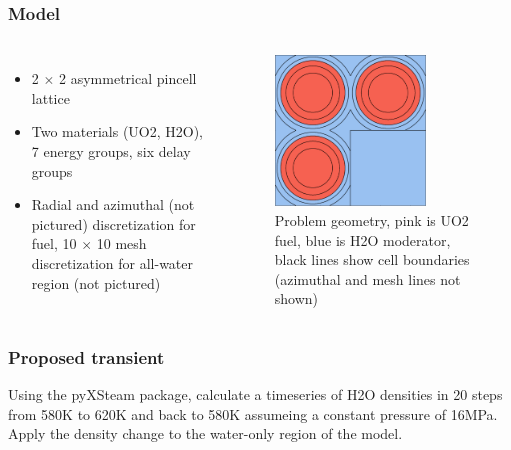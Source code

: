 \begin{frame}
  \frametitle{Model}
    \begin{columns}
        \column[t]{5cm}
            \begin{itemize}
                \item 2 $\times$ 2 asymmetrical pincell lattice
                \item Two materials (UO2, H2O), 7 energy groups, six delay
                    groups
                \item Radial and azimuthal (not pictured) discretization for
                    fuel, 10 $\times$ 10 mesh discretization for all-water region
                    (not pictured)
            \end{itemize}
        \column[t]{5cm}
            \begin{figure}[htbp!]
                \begin{center}
                    \includegraphics[height=4cm]{./figs/geometry-cells.png}
                \end{center}
                \caption{Problem geometry, pink is UO2 fuel, blue is H2O
                moderator, black lines show cell boundaries (azimuthal and mesh
                lines not shown)}
                \label{fig:geometry}
            \end{figure}
        \end{columns}
\end{frame}

\begin{frame}
  \frametitle{Proposed transient}

  Using the pyXSteam package, calculate a timeseries of H2O densities in
  20 steps from 
  580K to 620K and back to 580K assumeing a constant pressure of 16MPa.
  Apply the density change to the water-only region of the model.
\end{frame}


